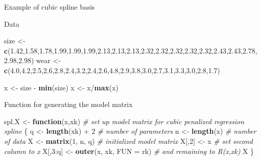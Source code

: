 \documentclass[14 pt,ignorenonframetext,]{beamer}
\newenvironment{Shaded}{}{}
\newcommand{\CommentTok}[1]{\textcolor[rgb]{0.38,0.63,0.69}{\textit{#1}}}
\newcommand{\ControlFlowTok}[1]{\textcolor[rgb]{0.00,0.44,0.13}{\textbf{#1}}}
\newcommand{\DataTypeTok}[1]{\textcolor[rgb]{0.56,0.13,0.00}{#1}}
\newcommand{\DecValTok}[1]{\textcolor[rgb]{0.25,0.63,0.44}{#1}}
\newcommand{\FloatTok}[1]{\textcolor[rgb]{0.25,0.63,0.44}{#1}}
\newcommand{\KeywordTok}[1]{\textcolor[rgb]{0.00,0.44,0.13}{\textbf{#1}}}
\newcommand{\NormalTok}[1]{#1}
\newcommand{\OperatorTok}[1]{\textcolor[rgb]{0.40,0.40,0.40}{#1}}
\newcommand{\StringTok}[1]{\textcolor[rgb]{0.25,0.44,0.63}{#1}}
\begin{document}
\begin{frame}[fragile]{Example of cubic spline basis}
\protect\hypertarget{example-of-cubic-spline-basis}{}

Data

\begin{Shaded}
\begin{Highlighting}[]
\NormalTok{size <-}\StringTok{ }\KeywordTok{c}\NormalTok{(}\FloatTok{1.42}\NormalTok{,}\FloatTok{1.58}\NormalTok{,}\FloatTok{1.78}\NormalTok{,}\FloatTok{1.99}\NormalTok{,}\FloatTok{1.99}\NormalTok{,}\FloatTok{1.99}\NormalTok{,}\FloatTok{2.13}\NormalTok{,}\FloatTok{2.13}\NormalTok{,}\FloatTok{2.13}\NormalTok{,}\FloatTok{2.32}\NormalTok{,}\FloatTok{2.32}\NormalTok{,}\FloatTok{2.32}\NormalTok{,}\FloatTok{2.32}\NormalTok{,}\FloatTok{2.32}\NormalTok{,}\FloatTok{2.43}\NormalTok{,}\FloatTok{2.43}\NormalTok{,}\FloatTok{2.78}\NormalTok{,}\FloatTok{2.98}\NormalTok{,}\FloatTok{2.98}\NormalTok{)}
\NormalTok{wear <-}\StringTok{ }\KeywordTok{c}\NormalTok{(}\FloatTok{4.0}\NormalTok{,}\FloatTok{4.2}\NormalTok{,}\FloatTok{2.5}\NormalTok{,}\FloatTok{2.6}\NormalTok{,}\FloatTok{2.8}\NormalTok{,}\FloatTok{2.4}\NormalTok{,}\FloatTok{3.2}\NormalTok{,}\FloatTok{2.4}\NormalTok{,}\FloatTok{2.6}\NormalTok{,}\FloatTok{4.8}\NormalTok{,}\FloatTok{2.9}\NormalTok{,}\FloatTok{3.8}\NormalTok{,}\FloatTok{3.0}\NormalTok{,}\FloatTok{2.7}\NormalTok{,}\FloatTok{3.1}\NormalTok{,}\FloatTok{3.3}\NormalTok{,}\FloatTok{3.0}\NormalTok{,}\FloatTok{2.8}\NormalTok{,}\FloatTok{1.7}\NormalTok{)}

\NormalTok{x <-}\StringTok{ }\NormalTok{size }\OperatorTok{-}\StringTok{ }\KeywordTok{min}\NormalTok{(size)}
\NormalTok{x <-}\StringTok{ }\NormalTok{x}\OperatorTok{/}\KeywordTok{max}\NormalTok{(x)}
\end{Highlighting}
\end{Shaded}

Function for generating the model matrix

\begin{Shaded}
\begin{Highlighting}[]
\NormalTok{spl.X <-}\StringTok{ }\ControlFlowTok{function}\NormalTok{(x,xk) }\CommentTok{# set up model matrix for cubic penalized regression spline }
\NormalTok{  \{ q <-}\StringTok{ }\KeywordTok{length}\NormalTok{(xk) }\OperatorTok{+}\StringTok{ }\DecValTok{2} \CommentTok{# number of parameters }
\NormalTok{    n <-}\StringTok{ }\KeywordTok{length}\NormalTok{(x) }\CommentTok{# number of data }
\NormalTok{    X <-}\StringTok{ }\KeywordTok{matrix}\NormalTok{(}\DecValTok{1}\NormalTok{, n, q) }\CommentTok{# initialized model matrix }
\NormalTok{    X[,}\DecValTok{2}\NormalTok{] <-}\StringTok{ }\NormalTok{x  }\CommentTok{# set second column to x}
\NormalTok{    X[,}\DecValTok{3}\OperatorTok{:}\NormalTok{q] <-}\StringTok{ }\KeywordTok{outer}\NormalTok{(x, xk, }\DataTypeTok{FUN =}\NormalTok{ rk) }\CommentTok{# and remaining to R(x,xk) }
\NormalTok{    X}
\NormalTok{\}}
\end{Highlighting}
\end{Shaded}

\end{frame}
\end{document}
